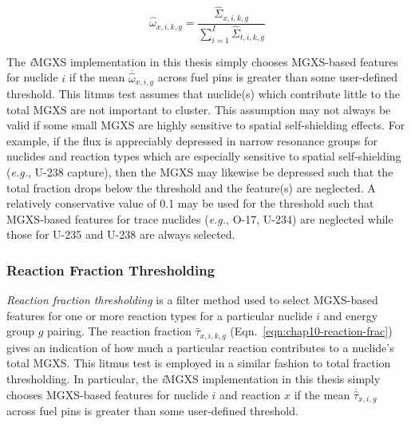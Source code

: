 \begin{equation}
\label{eqn:chap10-tot-frac}
\hat{\omega}_{x,i,k,g} = \frac{\hat{\Sigma}_{x,i,k,g}}{\displaystyle\sum\limits_{i=1}^{I}\hat{\Sigma}_{t,i,k,g}}
\end{equation}

The \textit{i}\ac{MGXS} implementation in this thesis simply chooses \ac{MGXS}-based features for nuclide $i$ if the mean $\overline{\hat{\omega}}_{x,i,g}$ across fuel pins is greater than some user-defined threshold. This litmus test assumes that nuclide(s) which contribute little to the total \ac{MGXS} are not important to cluster. This assumption may not always be valid if some small \ac{MGXS} are highly sensitive to spatial self-shielding effects. For example, if the flux is appreciably depressed in narrow resonance groups for nuclides and reaction types which are especially sensitive to spatial self-shielding (\textit{e.g.}, U-238 capture), then the \ac{MGXS} may likewise be depressed such that the total fraction drops below the threshold and the feature(s) are neglected. A relatively conservative value of 0.1 may be used for the threshold such that \ac{MGXS}-based features for trace nuclides (\textit{e.g.}, O-17, U-234) are neglected while those for U-235 and U-238 are always selected.




\subsubsection{Reaction Fraction Thresholding}
\label{subsubsec:chap10-litmus-react-frac}

\textit{Reaction fraction thresholding} is a filter method used to select \ac{MGXS}-based features for one or more reaction types for a particular nuclide $i$ and energy group $g$ pairing. The reaction fraction $\hat{\tau}_{x,i,k,g}$ (Eqn.~\ref{eqn:chap10-reaction-frac}) gives an indication of how much a particular reaction contributes to a nuclide's total \ac{MGXS}. This litmus test is employed in a similar fashion to total fraction thresholding. In particular, the \textit{i}\ac{MGXS} implementation in this thesis simply chooses \ac{MGXS}-based features for nuclide $i$ and reaction $x$ if the mean $\overline{\hat{\tau}}_{x,i,g}$ across fuel pins is greater than some user-defined threshold.

